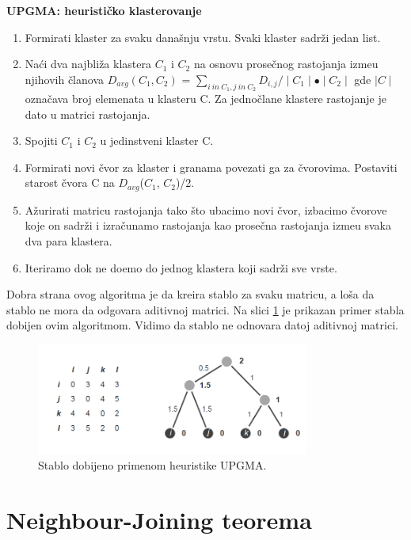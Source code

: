 \noindent\textbf{UPGMA: heuristi\v{c}ko klasterovanje}
\label{subsec:upgma}

\begin{enumerate}
\item Formirati klaster za svaku dana\v{s}nju vrstu. Svaki klaster sadr\v{z}i jedan list.
\item Na\'ci dva najbli\v{z}a klastera $C_1$ i $C_2$ na osnovu prose\v{c}nog rastojanja izme\dj u njihovih \v{c}lanova $D_{avg}(C_1, C_2)$ = $\sum_{i\ in\ C_1, j\ in\ C_2} D_{i, j} / \mid C_1 \mid \bullet \mid C_2 \mid $ gde $\mid C \mid$ ozna\v{c}ava broj elemenata u klasteru C. Za jednočlane klastere rastojanje je dato u matrici rastojanja.
\item Spojiti $C_1$ i $C_2$ u jedinstveni klaster C.
\item Formirati novi \v{c}vor za klaster i granama povezati ga za \v{c}vorovima. Postaviti starost \v{c}vora C na $D_{avg}$($C_1$, $C_2$)/2.
\item A\v{z}urirati matricu rastojanja tako \v{s}to ubacimo novi \v{c}vor, izbacimo \v{c}vorove koje on sadr\v{z}i i izra\v{c}unamo rastojanja kao prose\v{c}na rastojanja izme\dj u svaka dva para klastera.
\item Iteriramo dok ne do\dj emo do jednog klastera koji sadr\v{z}i sve vrste.
\end{enumerate}

Dobra strana ovog algoritma je da kreira stablo za svaku matricu, a lo\v{s}a da stablo ne mora da odgovara aditivnoj matrici. Na slici \ref{upgma} je prikazan primer stabla dobijen ovim algoritmom. Vidimo da stablo ne odnovara datoj aditivnoj matrici.

\begin{figure}[h!]
	\centering
	\includegraphics[width=0.8\textwidth]{poglavlja/7/slike/upgma.png}
	\caption{Stablo dobijeno primenom heuristike UPGMA.}
	\label{upgma}
\end{figure}


\section{Neighbour-Joining teorema}
\label{sec:njt}

